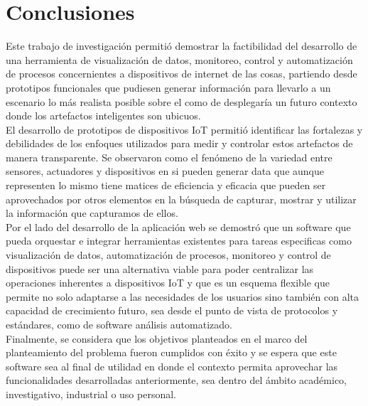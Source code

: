 

\chapter{Conclusiones}

Este trabajo de investigación permitió demostrar la factibilidad del desarrollo de una herramienta de visualización de datos, monitoreo, control y automatización de procesos concernientes a dispositivos de internet de las cosas, partiendo desde prototipos funcionales que pudiesen generar información para llevarlo a un escenario lo más realista posible sobre el como de desplegaría un futuro contexto donde los artefactos inteligentes son ubicuos.\\

El desarrollo de prototipos de dispositivos IoT permitió identificar las fortalezas y debilidades de los enfoques utilizados para medir y controlar estos artefactos de manera transparente. Se observaron como el fenómeno de la variedad entre sensores, actuadores y dispositivos en si pueden generar data que aunque representen lo mismo tiene matices de eficiencia y eficacia que pueden ser aprovechados por otros elementos en la búsqueda de capturar, mostrar y utilizar la información que capturamos de ellos.\\

Por el lado del desarrollo de la aplicación web se demostró que un software que pueda orquestar e integrar herramientas existentes para tareas especificas como visualización de datos, automatización de procesos, monitoreo y control de dispositivos puede ser una alternativa viable para poder centralizar las operaciones inherentes a dispositivos IoT y que es un esquema flexible que permite no solo adaptarse a las necesidades de los usuarios sino también con alta capacidad de crecimiento futuro, sea desde el punto de vista de protocolos y estándares, como de software análisis automatizado.\\

Finalmente, se considera que los objetivos planteados en el marco del planteamiento del problema fueron cumplidos con éxito y se espera que este software sea al final de utilidad en donde el contexto permita aprovechar las funcionalidades desarrolladas anteriormente, sea dentro del ámbito académico, investigativo, industrial o uso personal.

